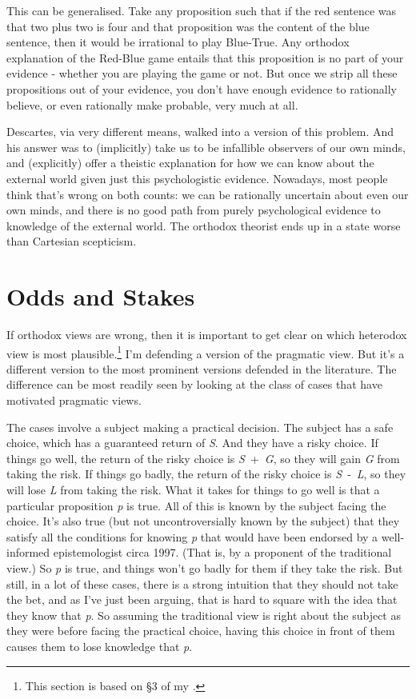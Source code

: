 \documentclass[
  11pt,
]{book}
\begin{document}
This can be generalised. Take any proposition such that if the red sentence was that two plus two is four and that proposition was the content of the blue sentence, then it would be irrational to play Blue-True. Any orthodox explanation of the Red-Blue game entails that this proposition is no part of your evidence - whether you are playing the game or not. But once we strip all these propositions out of your evidence, you don't have enough evidence to rationally believe, or even rationally make probable, very much at all.

Descartes, via very different means, walked into a version of this problem. And his answer was to (implicitly) take us to be infallible observers of our own minds, and (explicitly) offer a theistic explanation for how we can know about the external world given just this psychologistic evidence. Nowadays, most people think that's wrong on both counts: we can be rationally uncertain about even our own minds, and there is no good path from purely psychological evidence to knowledge of the external world. The orthodox theorist ends up in a state worse than Cartesian scepticism.

\hypertarget{oddsandstakes}{%
\section{Odds and Stakes}\label{oddsandstakes}}

If orthodox views are wrong, then it is important to get clear on which heterodox view is most plausible.\footnote{This section is based on §3 of my \citeyearpar{Weatherson2016}.} I'm defending a version of the pragmatic view. But it's a different version to the most prominent versions defended in the literature. The difference can be most readily seen by looking at the class of cases that have motivated pragmatic views.

The cases involve a subject making a practical decision. The subject has a safe choice, which has a guaranteed return of \emph{S}. And they have a risky choice. If things go well, the return of the risky choice is \emph{S}~+~\emph{G}, so they will gain \emph{G} from taking the risk. If things go badly, the return of the risky choice is \emph{S}~‑~\emph{L}, so they will lose \emph{L} from taking the risk. What it takes for things to go well is that a particular proposition \emph{p} is true. All of this is known by the subject facing the choice. It's also true (but not uncontroversially known by the subject) that they satisfy all the conditions for knowing \emph{p} that would have been endorsed by a well-informed epistemologist circa 1997. (That is, by a proponent of the traditional view.) So \emph{p} is true, and things won't go badly for them if they take the risk. But still, in a lot of these cases, there is a strong intuition that they should not take the bet, and as I've just been arguing, that is hard to square with the idea that they know that \emph{p}. So assuming the traditional view is right about the subject as they were before facing the practical choice, having this choice in front of them causes them to lose knowledge that \emph{p}.
\end{document}
